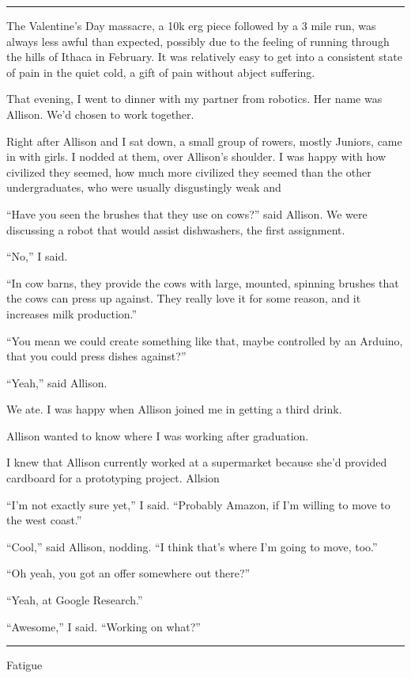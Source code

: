 \plainfancybreak{12pt}{2}{* * *}

The Valentine's Day massacre, a 10k erg piece followed by a 3 mile run, was
always less awful than expected, possibly due to the feeling of running through
the hills of Ithaca in February.  It was relatively easy to get into a
consistent state of pain in the quiet cold, a gift of pain without abject
suffering. 

That evening, I went to dinner with my partner from robotics.  Her name was
Allison.  We'd chosen to work together.  

Right after Allison and I sat down, a small group of rowers, mostly Juniors,
came in with girls.  I nodded at them, over Allison's shoulder.  I was happy
with how civilized they seemed, how much more civilized they seemed than the
other undergraduates, who were usually disgustingly weak and

``Have you seen the brushes that they use on cows?'' said Allison.  We were
discussing a robot that would assist dishwashers, the first assignment.

``No,'' I said.

``In cow barns, they provide the cows with large, mounted, spinning brushes that
the cows can press up against.  They really love it for some reason, and it
increases milk production.''

``You mean we could create something like that, maybe controlled by an Arduino,
that you could press dishes against?''

``Yeah,'' said Allison.

We ate.  I was happy when Allison joined me in getting a third drink.

Allison wanted to know where I was working after graduation.

I knew that Allison currently worked at a supermarket because she'd provided
cardboard for a prototyping project.  Allsion 

``I'm not exactly sure yet,'' I said.  ``Probably Amazon, if I'm willing to move
to the west coast.''

``Cool,'' said Allison, nodding.  ``I think that's where I'm going to move,
too.''

``Oh yeah, you got an offer somewhere out there?''

``Yeah, at Google Research.''

``Awesome,'' I said.  ``Working on what?''

\plainfancybreak{12pt}{2}{* * *}

Fatigue

